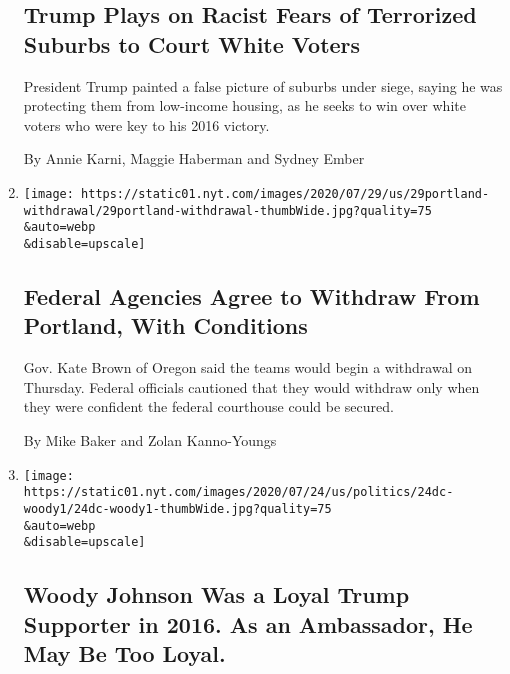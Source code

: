 \begin{enumerate}
  \hypertarget{trump-plays-on-racist-fears-of-terrorized-suburbs-to-court-white-voters}{%
  \subsection{Trump Plays on Racist Fears of Terrorized Suburbs to Court
  White
  Voters}\label{trump-plays-on-racist-fears-of-terrorized-suburbs-to-court-white-voters}}

  President Trump painted a false picture of suburbs under siege, saying
  he was protecting them from low-income housing, as he seeks to win
  over white voters who were key to his 2016 victory.

  By Annie Karni, Maggie Haberman and Sydney Ember
\item
  \href{/2020/07/29/us/protests-portland-federal-withdrawal.html}{}

  \texttt{[image: https://static01.nyt.com/images/2020/07/29/us/29portland-withdrawal/29portland-withdrawal-thumbWide.jpg?quality=75\\\&auto=webp\\\&disable=upscale]}

  \hypertarget{federal-agencies-agree-to-withdraw-from-portland-with-conditions}{%
  \subsection{Federal Agencies Agree to Withdraw From Portland, With
  Conditions}\label{federal-agencies-agree-to-withdraw-from-portland-with-conditions}}

  Gov. Kate Brown of Oregon said the teams would begin a withdrawal on
  Thursday. Federal officials cautioned that they would withdraw only
  when they were confident the federal courthouse could be secured.

  By Mike Baker and Zolan Kanno-Youngs
\item
  \href{/2020/07/24/world/europe/woody-johnson-trump.html}{}

  \texttt{[image: https://static01.nyt.com/images/2020/07/24/us/politics/24dc-woody1/24dc-woody1-thumbWide.jpg?quality=75\\\&auto=webp\\\&disable=upscale]}

  \hypertarget{woody-johnson-was-a-loyal-trump-supporter-in-2016-as-an-ambassador-he-may-be-too-loyal}{%
  \subsection{Woody Johnson Was a Loyal Trump Supporter in 2016. As an
  Ambassador, He May Be Too
  Loyal.}\label{woody-johnson-was-a-loyal-trump-supporter-in-2016-as-an-ambassador-he-may-be-too-loyal}}


\end{enumerate}
